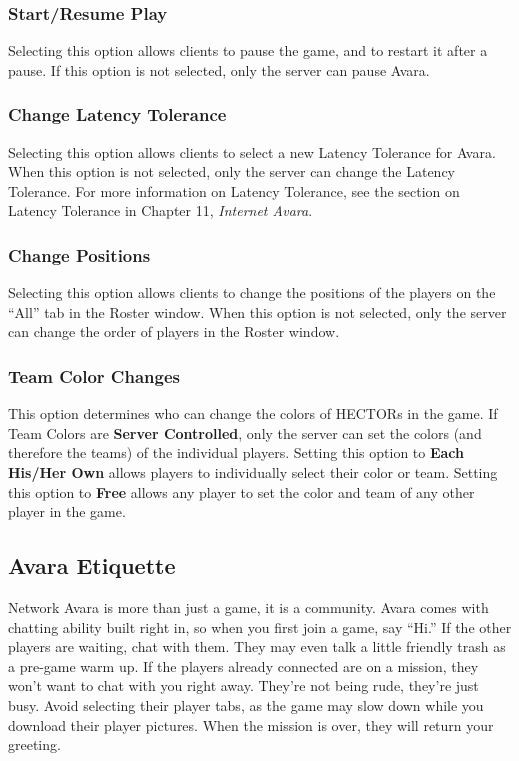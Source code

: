 \documentclass{article}
\begin{document}
\subsubsection{Start/Resume Play}
Selecting this option allows clients to pause the game, and to restart it after a pause. If this option is not selected, only the server can pause Avara.

\subsubsection{Change Latency Tolerance}
Selecting this option allows clients to select a new Latency Tolerance for Avara. When this option is not selected, only the server can change the Latency Tolerance. For more information on Latency Tolerance, see the section on Latency Tolerance in Chapter 11, \textit{Internet Avara}.

\subsubsection{Change Positions}
Selecting this option allows clients to change the positions of the players on the ``All'' tab in the Roster window. When this option is not selected, only the server can change the order of players in the Roster window.

\subsubsection{Team Color Changes}
This option determines who can change the colors of HECTORs in the game. If Team Colors are \textbf{Server Controlled}, only the server can set the colors (and therefore the teams) of the individual players. Setting this option to \textbf{Each His/Her Own} allows players to individually select their color or team. Setting this option to \textbf{Free} allows any player to set the color and team of any other player in the game.

\subsection{Avara Etiquette}
Network Avara is more than just a game, it is a community. Avara comes with chatting ability built right in, so when you first join a game, say ``Hi.'' If the other players are waiting, chat with them. They may even talk a little friendly trash as a pre-game warm up. If the players already connected are on a mission, they won't want to chat with you right away. They're not being rude, they're just busy. Avoid selecting their player tabs, as the game may slow down while you download their player pictures. When the mission is over, they will return your greeting.
\end{document}
